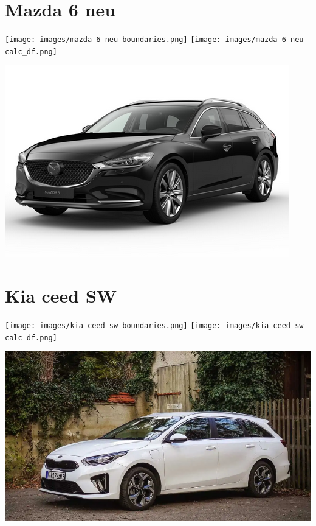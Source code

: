 \documentclass[landscape, DIV=99, 14pt]{scrartcl}
\begin{document}
\pagebreak


\twocolumn

\section*{Mazda 6 neu}
\begin{center}
\texttt{[image: images/mazda-6-neu-boundaries.png]}
\null
\vspace{0.5cm}
\texttt{[image: images/mazda-6-neu-calc\_df.png]}
\end{center}

\pagebreak
\null
\vspace{2cm}
\begin{center}
\includegraphics[width=0.9\columnwidth]{cars/mazda-6-neu.png}
\end{center}

\pagebreak


\twocolumn

\section*{Kia ceed SW}
\begin{center}
\texttt{[image: images/kia-ceed-sw-boundaries.png]}
\null
\vspace{0.5cm}
\texttt{[image: images/kia-ceed-sw-calc\_df.png]}
\end{center}

\pagebreak
\null
\vspace{2cm}
\begin{center}
\includegraphics[width=0.9\columnwidth]{cars/kia-ceed-sportswagon.png}
\end{center}
\end{document}
